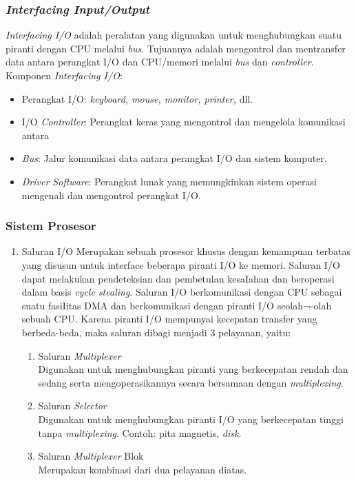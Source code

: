 \subsubsection{\textit{Interfacing Input/Output}}
\textit{Interfacing I/O} adalah peralatan yang digunakan untuk menghubungkan suatu piranti dengan CPU melalui \textit{bus}. Tujuannya adalah mengontrol dan mentransfer data antara perangkat I/O dan CPU/memori melalui \textit{bus} dan \textit{controller}.
Komponen \textit{Interfacing I/O}:
\begin{itemize}
    \item Perangkat I/O: \textit{keyboard, mouse, monitor, printer,} dll.
    \item I/O \textit{Controller}: Perangkat keras yang mengontrol dan mengelola komunikasi antara 
    \item \textit{Bus}: Jalur komunikasi data antara perangkat I/O dan sistem komputer.
    \item \textit{Driver Software}: Perangkat lunak yang memungkinkan sistem operasi mengenali dan mengontrol perangkat I/O.
\end{itemize}

\subsubsection{Sistem Prosesor}
\begin{enumerate}
    \item {Saluran I/O}
Merupakan sebuah prosesor khusus dengan kemampuan terbatas yang disusun untuk interface beberapa piranti I/O ke memori. Saluran I/O dapat melakukan pendeteksian dan pembetulan kesaIahan dan beroperasi dalam basis \textit{cycle stealing}. Saluran I/O berkomunikasi dengan CPU sebagai suatu fasiIitas DMA dan berkomunikasi dengan piranti I/O seolah¬-olah sebuah CPU. Karena piranti I/O mempunyai kecepatan transfer yang berbeda-beda, maka saluran dibagi menjadi 3 pelayanan, yaitu:
\begin{enumerate}
    \item Saluran \textit{Multiplexer} \\
    Digunakan untuk menghubungkan piranti yang berkecepatan rendah dan sedang serta mengoperasikannya secara bersamaan dengan \textit{multiplexing}.
    \item  Saluran \textit{Selector} \\
    Digunakan untuk menghubungkan piranti I/O yang berkecepatan tinggi tanpa \textit{multiplexing}. Contoh: pita magnetis, \textit{disk}.
    \item Saluran \textit{Multiplexer} Blok \\
    Merupakan kombinasi dari dua pelayanan diatas.
\end{enumerate}
\end{enumerate}



